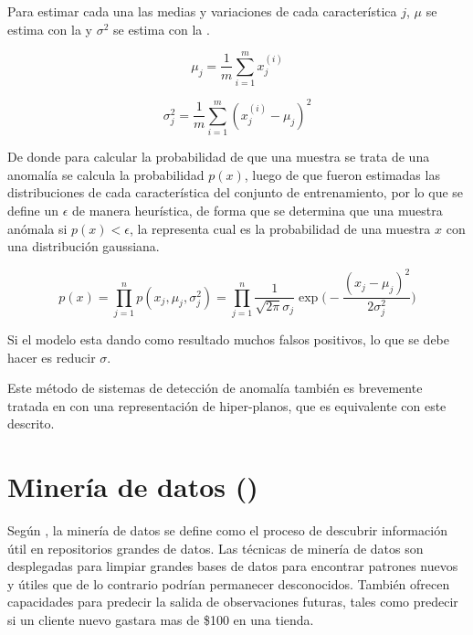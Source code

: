 Para estimar cada una las medias y variaciones de cada característica $j$, $\mu$ se estima con la  y $\sigma^2$ se estima con la .

\begin{equation} \label{eq:anomaly-mu}
  \mu_j = \frac{1}{m} \sum_{i=1}^{m} x_j^{(i)}
\end{equation}

\begin{equation} \label{eq:anomaly-sigma}
  \sigma_j^2 = \frac{1}{m} \sum_{i=1}^{m} (x_j^{(i)} - \mu_j)^2
\end{equation}

De donde para calcular la probabilidad de que una muestra se trata de una anomalía se calcula la probabilidad $p(x)$, luego de que fueron estimadas las distribuciones de cada característica del conjunto de entrenamiento, por lo que se define un $\epsilon$ de manera heurística, de forma que se determina que una muestra anómala si $p(x) < \epsilon$, la  representa cual es la probabilidad de una muestra $x$ con una distribución gaussiana.

\begin{equation} \label{eq:anomaly-prob}
  p(x) = \prod_{j=1}^{n}p(x_j, \mu_j, \sigma_j^2) = \prod_{j=1}^{n} \frac{1}{\sqrt{2\pi}\sigma_j} \exp\Bigg( - \frac{(x_j-\mu_j)^2}{2\sigma_j^2}\Bigg)
\end{equation}

Si el modelo esta dando como resultado muchos falsos positivos, lo que se debe hacer es reducir $\sigma$.

Este método de sistemas de detección de anomalía también es brevemente tratada en \cite{osint} con una representación de hiper-planos, que es equivalente con este descrito.

\section{Minería de datos ()} \label{sec:datamining}
Según \cite{tan2005introduction}, la minería de datos se define como el proceso de descubrir información útil en repositorios grandes de datos. Las técnicas de minería de datos son desplegadas para limpiar grandes bases de datos para encontrar patrones nuevos y útiles que de lo contrario podrían permanecer desconocidos. También ofrecen capacidades para predecir la salida de observaciones futuras, tales como predecir si un cliente nuevo gastara mas de \$100 en una tienda.

